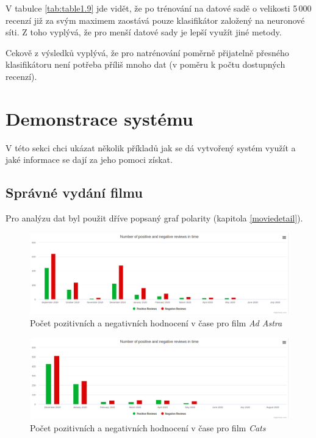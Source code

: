 V tabulce \ref{tab:table1.9} jde vidět, že po trénování na datové sadě o velikosti 5\,000 recenzí již za svým maximem zaostává pouze klasifikátor založený na neuronové síti. Z toho vyplývá, že pro menší datové sady je lepší využít jiné metody. 

Cekově z výsledků vyplývá, že pro natrénování poměrně přijatelně přesného klasifikátoru není potřeba příliš mnoho dat (v poměru k počtu dostupných recenzí). 

\section{Demonstrace systému}
V této sekci chci ukázat několik příkladů jak se dá vytvořený systém využít a jaké informace se dají za jeho pomoci získat. 


\subsection{Správné vydání filmu}

Pro analýzu dat byl použit dříve popsaný graf polarity (kapitola \ref{moviedetail}). 
\begin{figure}[!htb]
\label{ad_astra}
\includegraphics[width=\textwidth]{ad_astra.png}
\caption{Počet pozitivních a negativních hodnocení v čase pro film \emph{Ad Astra}}
\end{figure}

\begin{figure}[!htb]
\label{cats}
\includegraphics[width=\textwidth]{cats.png}
\caption{Počet pozitivních a negativních hodnocení v čase pro film \emph{Cats}}
\end{figure}

